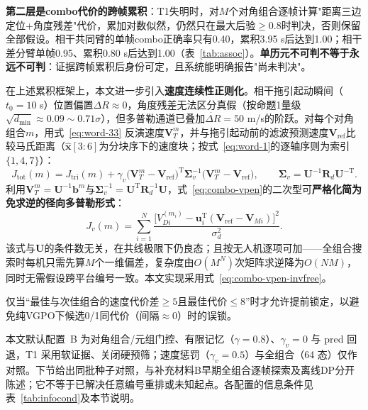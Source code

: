 \documentclass[UTF8,a4paper,zihao=-4]{ctexart}
\begin{document}
\textbf{第二层是combo代价的跨帧累积}：T1失明时，对\(M\)个对角组合逐帧计算"距离三边定位+角度残差"代价，累加对数似然，仍然只在最大后验\(\ge0.8\)时判决，否则保留全部假设。相干共同臂的单帧combo正确率只有0.40，累积3.95 s后达到1.00；相干差分臂单帧0.95、累积0.80 s后达到1.00（表~\ref{tab:assoc}）。\textbf{单历元不可判不等于永远不可判}：证据跨帧累积后身份可定，且系统能明确报告"尚未判决"。

在上述累积框架上，本文进一步引入\textbf{速度连续性正则化}。相干拖引起动瞬间（\(t_0=10\) s）位置偏置\(\Delta R\approx0\)，角度残差无法区分真假（按命题1量级\(\sqrt{d_{\min}}\approx0.09\sim0.71\sigma\)），但多普勒通道已叠加\(\dot{\Delta R}=50\) m/s的阶跃。对每个对角组合\(m\)，用式~\eqref{eq:word-33} 反演速度\(\boldsymbol V_T^m\)，并与拖引起动前的滤波预测速度\(\boldsymbol V_{\mathrm{ref}}\)比较马氏距离（\(\hat{\boldsymbol x}[3:6]\)为分块序下的速度块；按式~\eqref{eq:word-1}的逐轴序则为索引\(\{1,4,7\}\)）：
\begin{equation}
J_{\mathrm{tot}}(m)=J_{\mathrm{tri}}(m)+\gamma_v\bigl(\boldsymbol V_T^m-\boldsymbol V_{\mathrm{ref}}\bigr)^{\mathrm T}
\boldsymbol\Sigma_v^{-1}\bigl(\boldsymbol V_T^m-\boldsymbol V_{\mathrm{ref}}\bigr),\qquad
\boldsymbol\Sigma_v=\boldsymbol U^{-1}\boldsymbol R_d\boldsymbol U^{-\mathrm T}.
\label{eq:combo-vpen}
\end{equation}
利用\(\boldsymbol V_T^m=\boldsymbol U^{-1}\boldsymbol b^m\)与\(\boldsymbol\Sigma_v^{-1}=\boldsymbol U^{\mathrm T}\boldsymbol R_d^{-1}\boldsymbol U\)，式~\eqref{eq:combo-vpen}的二次型可\textbf{严格化简为免求逆的径向多普勒形式}：
\begin{equation}
J_v(m)=\sum_{i=1}^{N}\frac{\bigl[V_{Di}^{(m_i)}-\boldsymbol u_i^{\mathrm T}(\boldsymbol V_{\mathrm{ref}}-\boldsymbol V_{Mi})\bigr]^2}{\sigma_d^2}.
\label{eq:combo-vpen-invfree}
\end{equation}
该式与\(\boldsymbol U\)的条件数无关，在共线极限下仍良态；且按无人机逐项可加——全组合搜索时每机只需先算\(M\)个一维偏差，复杂度由\(O(M^N)\)次矩阵求逆降为\(O(NM)\)，同时无需假设跨平台编号一致。本文实现采用式~\eqref{eq:combo-vpen-invfree}。

仅当“最佳与次佳组合的速度代价差\(\ge5\)且最佳代价\(\le8\)”时才允许提前锁定，以避免纯VGPO下候选0/1同代价（间隔\(\approx0\)）时的误锁。

本文默认配置~B 为对角组合/元组门控、有限记忆（$\gamma=0.8$）、$\gamma_v=0$ 与 pred 回退，T1 采用软证据、关闭硬预筛；速度惩罚（$\gamma_v=0.5$）与全组合（64 态）仅作对照。下节给出同批种子对照，与补充材料B早期全组合逐帧探索及离线DP分开陈述；它不等于已解决任意编号重排或未知起点。各配置的信息条件见表~\ref{tab:infocond}及本节说明。
\end{document}
